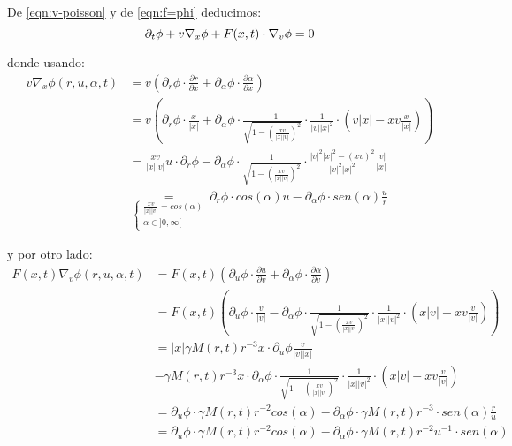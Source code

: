 \documentclass[a4paper,10pt]{scrartcl}
\theoremstyle{definition}
\numberwithin{equation}{section}
\begin{document}
De \eqref{eqn:v-poisson} y de \eqref{eqn:f=phi} deducimos:
\[
\partial_t \phi + v \nabla_x \phi + F(x,t) \cdot \nabla_v \phi = 0\\
\]

donde usando:
\begin{align*}
 v \nabla_x \phi(r, u, \alpha, t) &= v \left(\partial_r \phi \cdot \frac{\partial r}{\partial x} + \partial_\alpha \phi \cdot \frac{\partial \alpha}{\partial x} \right)\\
 &= v\left(\partial_r \phi \cdot \frac{x}{|x|} + \partial_\alpha \phi \cdot \frac{-1}{\sqrt{1 - \left(\frac{xv}{|x||v|}\right)^2}} \cdot \frac{1}{|v||x|^2} \cdot\left(v|x| - xv \frac{x}{|x|}\right)\right)\\
 &= \frac{xv}{|x||v|} u \cdot\partial_r \phi - \partial_\alpha \phi \cdot \frac{1}{\sqrt{1 - \left(\frac{xv}{|x||v|}\right)^2}} \cdot \frac{|v|^2|x|^2 - (xv)^2}{|v|^2|x|^2} \frac{|v|}{|x|}\\
 &\underset{\left\{\begin{array}{c} \frac{xv}{|x||v|} = cos(\alpha)\\ \alpha \in ]0,\infty[\end{array}\right.}{=} \partial_r \phi \cdot cos(\alpha) u - \partial_\alpha \phi \cdot sen(\alpha) \frac{u}{r}
\end{align*}

y  por otro lado:
\begin{align*}
F(x,t) \nabla_v \phi(r, u, \alpha, t) &= F(x,t) \left(\partial_u \phi \cdot \frac{\partial u}{\partial v} + \partial_\alpha \phi \cdot \frac{\partial \alpha}{\partial v} \right) \\
&= F(x,t) \left(\partial_u \phi \cdot \frac{v}{|v|} - \partial_\alpha \phi \cdot \frac{1}{\sqrt{1 - \left(\frac{xv}{|x||v|}\right)^2}} \cdot \frac{1}{|x||v|^2} \cdot\left(x|v| - xv \frac{v}{|v|}\right)\right) \\
&= |x| \gamma M(r,t) r^{-3} x \cdot \partial_u \phi \frac{v}{|v||x|}\\
&- \gamma M(r,t) r^{-3} x \cdot \partial_\alpha \phi \cdot \frac{1}{\sqrt{1 - \left(\frac{xv}{|x||v|}\right)^2}} \cdot \frac{1}{|x||v|^2} \cdot\left(x|v| - xv \frac{v}{|v|}\right)\\
&= \partial_u \phi \cdot \gamma M(r,t) r^{-2} cos(\alpha) - \partial_\alpha \phi \cdot \gamma M(r,t) r^{-3} \cdot sen(\alpha) \frac{r}{u} \\
&= \partial_u \phi \cdot \gamma M(r,t) r^{-2} cos(\alpha) - \partial_\alpha \phi \cdot \gamma M(r,t) r^{-2} u^{-1} \cdot sen(\alpha)
\end{align*}
\end{document}
